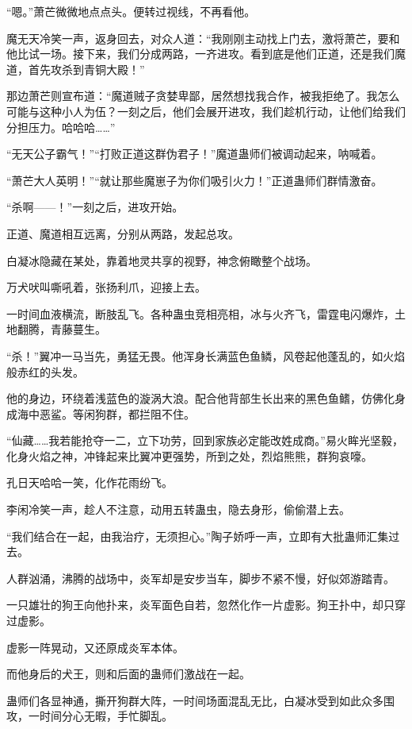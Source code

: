 \begin{this_body}
“嗯。”萧芒微微地点点头。便转过视线，不再看他。

魔无天冷笑一声，返身回去，对众人道：“我刚刚主动找上门去，激将萧芒，要和他比试一场。接下来，我们分成两路，一齐进攻。看到底是他们正道，还是我们魔道，首先攻杀到青铜大殿！”

那边萧芒则宣布道：“魔道贼子贪婪卑鄙，居然想找我合作，被我拒绝了。我怎么可能与这种小人为伍？一刻之后，他们会展开进攻，我们趁机行动，让他们给我们分担压力。哈哈哈……”

“无天公子霸气！”“打败正道这群伪君子！”魔道蛊师们被调动起来，呐喊着。

“萧芒大人英明！”“就让那些魔崽子为你们吸引火力！”正道蛊师们群情激奋。

“杀啊——！”一刻之后，进攻开始。

正道、魔道相互远离，分别从两路，发起总攻。

白凝冰隐藏在某处，靠着地灵共享的视野，神念俯瞰整个战场。

万犬吠叫嘶吼着，张扬利爪，迎接上去。

一时间血液横流，断肢乱飞。各种蛊虫竞相亮相，冰与火齐飞，雷霆电闪爆炸，土地翻腾，青藤蔓生。

“杀！”翼冲一马当先，勇猛无畏。他浑身长满蓝色鱼鳞，风卷起他蓬乱的，如火焰般赤红的头发。

他的身边，环绕着浅蓝色的漩涡大浪。配合他背部生长出来的黑色鱼鳍，仿佛化身成海中恶鲨。等闲狗群，都拦阻不住。

“仙藏……我若能抢夺一二，立下功劳，回到家族必定能改姓成商。”易火眸光坚毅，化身火焰之神，冲锋起来比翼冲更强势，所到之处，烈焰熊熊，群狗哀嚎。

孔日天哈哈一笑，化作花雨纷飞。

李闲冷笑一声，趁人不注意，动用五转蛊虫，隐去身形，偷偷潜上去。

“我们结合在一起，由我治疗，无须担心。”陶子娇呼一声，立即有大批蛊师汇集过去。

人群汹涌，沸腾的战场中，炎军却是安步当车，脚步不紧不慢，好似郊游踏青。

一只雄壮的狗王向他扑来，炎军面色自若，忽然化作一片虚影。狗王扑中，却只穿过虚影。

虚影一阵晃动，又还原成炎军本体。

而他身后的犬王，则和后面的蛊师们激战在一起。

蛊师们各显神通，撕开狗群大阵，一时间场面混乱无比，白凝冰受到如此众多围攻，一时间分心无暇，手忙脚乱。

\end{this_body}


